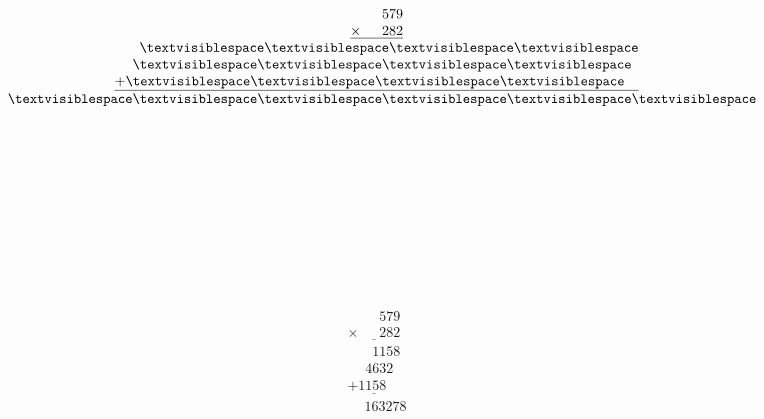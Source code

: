 \begin{minipage}[t]{0.3\linewidth}
\begin{align*}\begin{array}{c}
\phantom{
\times000
}
579\\
\underline{
\times
\phantom{
000
}
282
}\\
\phantom{
+00
}
\textvisiblespace
\textvisiblespace
\textvisiblespace
\textvisiblespace
\\
\phantom{
+0
}
\textvisiblespace
\textvisiblespace
\textvisiblespace
\textvisiblespace
\phantom0\\
\underline{
+
\textvisiblespace
\textvisiblespace
\textvisiblespace
\textvisiblespace
\phantom0\phantom0
}
\\
\phantom{+}
\textvisiblespace
\textvisiblespace
\textvisiblespace
\textvisiblespace
\textvisiblespace
\textvisiblespace
\end{array}\end{align*}
\end{minipage}
\begin{minipage}[t]{0.05\linewidth}
\begin{align*}\begin{array}{c}
\textvisiblespace
\\
\textvisiblespace
\\
\textvisiblespace
\\
\textvisiblespace
\\
\textvisiblespace
\\
\textvisiblespace
\end{array}\end{align*}
\end{minipage}
\begin{minipage}[t]{0.05\linewidth}
\begin{align*}\begin{array}{c}
\textvisiblespace
\\
\textvisiblespace
\\
\textvisiblespace
\end{array}\end{align*}
\end{minipage}
\begin{minipage}[t]{0.3\linewidth}
\begin{align*}\begin{array}{c}
\phantom{
\times000
}
579\\
\underline{
\times
\phantom{
000
}
282
}\\
\phantom{
+00
}
1158
\\
\phantom{
+0
}
4632
\phantom0\\
\underline{
+
1158
\phantom0\phantom0
}
\\
\phantom{+}
163278
\end{array}\end{align*}
\end{minipage}
